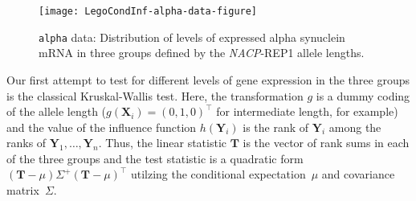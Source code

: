\documentclass{article}
\newcommand{\Robject}[1]{\texttt{#1}}
\newcommand{\X}{\mathbf{X}}
\newcommand{\Y}{\mathbf{Y}}
\newcommand{\T}{\mathbf{T}}
\begin{document}
\begin{sidewaysfigure}
\begin{center}
\texttt{[image: LegoCondInf-alpha-data-figure]}
\caption{\Robject{alpha} data: Distribution of levels of expressed alpha synuclein mRNA
         in three groups defined by the \textit{NACP}-REP1 allele lengths.
         \label{alpha-box}}
\end{center}
\end{sidewaysfigure}
Our first attempt to test for different levels of gene expression in the three
groups is the classical Kruskal-Wallis test. Here, the transformation 
$g$ is a dummy coding of the allele length ($g(\X_i) = (0, 1, 0)^\top$ for
intermediate length, for example) and the value of the influence function 
$h(\Y_i)$ is the rank of $\Y_i$ among the ranks of $\Y_1, \dots, \Y_n$.
Thus, the linear statistic $\T$ is the vector of rank sums in each of the 
three groups and the test statistic is a quadratic form 
$(\T - \mu) \Sigma^+ (\T - \mu)^\top$ 
utilzing the conditional expectation~$\mu$ and covariance matrix~$\Sigma$.
\end{document}
